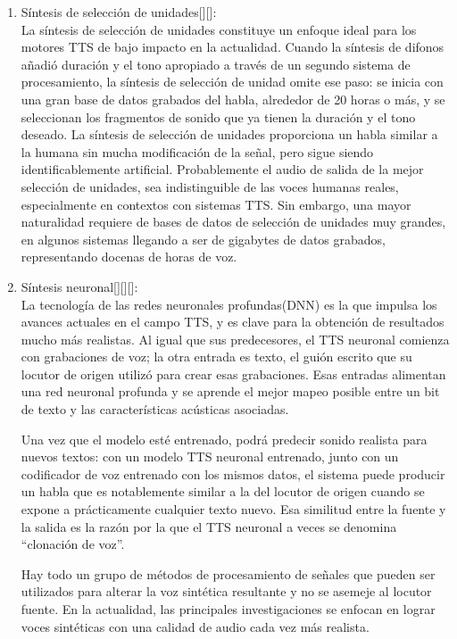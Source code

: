 \begin{enumerate}
	\item Síntesis de selección de unidades[\cite{beutnagel1998diphone}][\cite{guzman2004sintetizador}]: \\ La síntesis de selección de unidades constituye un enfoque ideal para los motores TTS de bajo impacto en la actualidad. Cuando la síntesis de difonos añadió duración y el tono apropiado a través de un segundo sistema de procesamiento, la síntesis de selección de unidad omite ese paso: se inicia con una gran base de datos grabados del habla, alrededor de 20 horas o más, y se seleccionan los fragmentos de sonido que ya tienen la duración y el tono deseado. La síntesis de selección de unidades proporciona un habla similar a la humana sin mucha modificación de la señal, pero sigue siendo identificablemente artificial. Probablemente el audio de salida de la mejor selección de unidades, sea indistinguible de las voces humanas reales, especialmente en contextos con sistemas TTS. Sin embargo, una mayor naturalidad requiere de bases de datos de selección de unidades muy grandes, en algunos sistemas llegando a ser de gigabytes de datos grabados, representando docenas de horas de voz. 
	
	\item Síntesis neuronal[\cite{wang2017tacotron}][\cite{ren2019fastspeech}][\cite{lancucki2021fastpitch}]: \\ La tecnología de las redes neuronales profundas(DNN) es la que impulsa los avances actuales en el campo TTS, y es clave para la obtención de resultados mucho más realistas. Al igual que sus predecesores, el TTS neuronal comienza con grabaciones de voz; la otra entrada es texto, el guión escrito que su locutor de origen utilizó para crear esas grabaciones. Esas entradas alimentan una red neuronal profunda y se aprende el mejor mapeo posible entre un bit de texto y las características acústicas asociadas. 
	
	Una vez que el modelo esté entrenado, podrá predecir sonido realista para nuevos textos: con un modelo TTS neuronal entrenado, junto con un codificador de voz entrenado con los mismos datos, el sistema puede producir un habla que es notablemente similar a la del locutor de origen cuando se expone a prácticamente cualquier texto nuevo. Esa similitud entre la fuente y la salida	es la razón por la que el TTS neuronal a veces se denomina “clonación de voz”.
	
	Hay todo un grupo de métodos de procesamiento de señales que pueden ser utilizados para alterar la voz sintética resultante y no se asemeje al locutor fuente. En la actualidad, las principales investigaciones se enfocan en lograr voces sintéticas con una calidad de audio cada vez más realista.
\end{enumerate}

